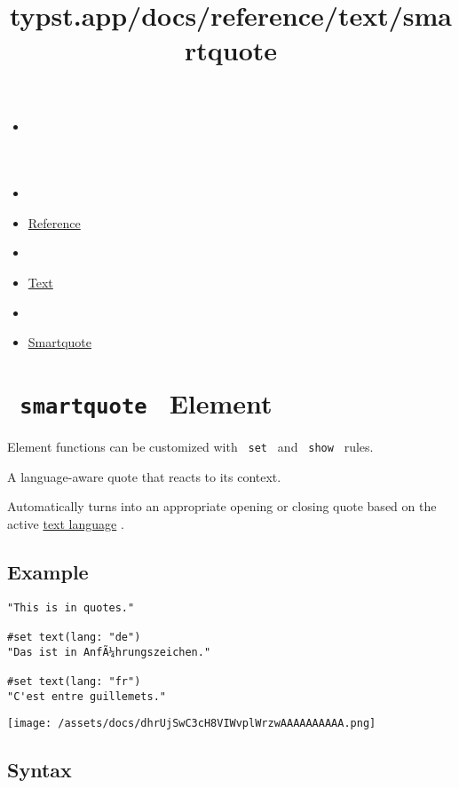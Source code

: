 \title{typst.app/docs/reference/text/smartquote}

\begin{itemize}
\tightlist
\item
  \href{/docs}{}
\item
  
\item
  \href{/docs/reference/}{Reference}
\item
  
\item
  \href{/docs/reference/text/}{Text}
\item
  
\item
  \href{/docs/reference/text/smartquote/}{Smartquote}
\end{itemize}

\section{\texorpdfstring{\texttt{\ smartquote\ } {{ Element
}}}{ smartquote   Element }}\label{summary}

\label{element-tooltip}
Element functions can be customized with \texttt{\ set\ } and
\texttt{\ show\ } rules.

A language-aware quote that reacts to its context.

Automatically turns into an appropriate opening or closing quote based
on the active \href{/docs/reference/text/text/\#parameters-lang}{text
language} .

\subsection{Example}\label{example}

\begin{verbatim}
"This is in quotes."

#set text(lang: "de")
"Das ist in AnfÃ¼hrungszeichen."

#set text(lang: "fr")
"C'est entre guillemets."
\end{verbatim}

\texttt{[image: /assets/docs/dhrUjSwC3cH8VIWvplWrzwAAAAAAAAAA.png]}

\subsection{Syntax}\label{syntax}

